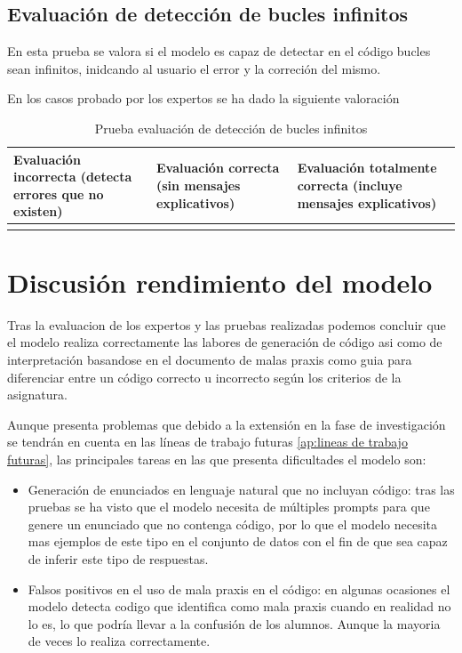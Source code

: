 \subsection{Evaluación de detección de bucles infinitos}

En esta prueba se valora si el modelo es capaz de detectar en el código bucles sean infinitos, inidcando al usuario el error y la correción del mismo.

En los casos probado por los expertos se ha dado la siguiente valoración

\begin{table}[htb]
    \centering
    \begin{tabular}{| >{\arraybackslash}m{}| >{\arraybackslash}m{} | >{\arraybackslash}m{}|} \hline
    \vspace{0.5em}  Evaluación incorrecta (detecta errores que no existen) \vspace{0.5em} &  Evaluación correcta (sin mensajes explicativos) & Evaluación totalmente correcta (incluye mensajes explicativos) \\ \hline
     &  & \multicolumn{1}{|c|}{X} \\ \hline 
    \end{tabular}\caption{Prueba evaluación de detección de bucles infinitos}
    \label{tabla:evaluacion-ej1}
\end{table}

\section{Discusión rendimiento del modelo}

Tras la evaluacion de los expertos y las pruebas realizadas podemos concluir que el modelo realiza correctamente las labores de generación de código asi como de interpretación basandose en el documento de malas praxis como guia para diferenciar entre un código correcto u incorrecto según los criterios de la asignatura.

Aunque presenta problemas que debido a la extensión en la fase de investigación se tendrán en cuenta en las líneas de trabajo futuras \ref{ap:lineas de trabajo futuras}, las principales tareas en las que presenta dificultades el modelo son:

\begin{itemize}
    \item Generación de enunciados en lenguaje natural que no incluyan código: tras las pruebas se ha visto que el modelo necesita de múltiples prompts para que genere un enunciado que no contenga código, por lo que el modelo necesita mas ejemplos de este tipo en el conjunto de datos con el fin de que sea capaz de inferir este tipo de respuestas.
    
    \item Falsos positivos en el uso de mala praxis en el código: en algunas ocasiones el modelo detecta codigo que identifica como mala praxis cuando en realidad no lo es, lo que podría llevar a la confusión de los alumnos. Aunque la mayoria de veces lo realiza correctamente.
\end{itemize}




